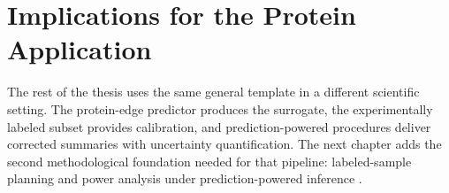 \section{Implications for the Protein Application}

The rest of the thesis uses the same general template in a different scientific setting. The protein-edge predictor produces the surrogate, the experimentally labeled subset provides calibration, and prediction-powered procedures deliver corrected summaries with uncertainty quantification. The next chapter adds the second methodological foundation needed for that pipeline: labeled-sample planning and power analysis under prediction-powered inference \parencite{ppi_power}.
